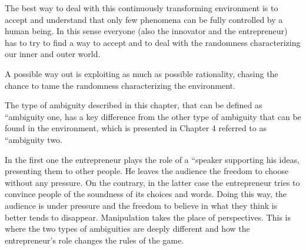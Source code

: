 The best way to deal with this continuously transforming environment is to accept and understand that only few phenomena can be fully controlled by a human being. In this sense everyone (also the innovator and the entrepreneur) has to try to find a way to accept and to deal with the randomness characterizing our inner and outer world.

A possible way out is exploiting as much as possible rationality, chasing the chance to tame the randomness characterizing the environment.

The type of ambiguity described in this chapter, that can be defined as ``ambiguity one, has a key difference from the other type of ambiguity that can be found in the environment, which is presented in Chapter 4 referred to as ``ambiguity two.

In the first one the entrepreneur plays the role of a ``speaker supporting his ideas, presenting them to other people. He leaves the audience the freedom to choose without any pressure. On the contrary, in the latter case the entrepreneur tries to convince people of the soundness of its choices and words. Doing this way, the audience is under pressure and the freedom to believe in what they think is better tends to disappear. Manipulation takes the place of perspectives. This is where the two types of ambiguities are deeply different and how the entrepreneur’s role changes the rules of the game.
